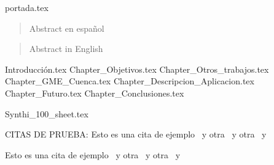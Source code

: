 \documentclass[draft, a4paper,openany,oneside,12pt]{report}
\begin{document}

	{portada.tex}
	\newpage
	\mbox{}
	\thispagestyle{empty} %
	\pagestyle{fancy}

\onehalfspace



\begin{abstract}
	\setcounter{page}{2}
	Abstract en español
	\thispagestyle{plain}
\end{abstract}
\begin{abstract}
	\setcounter{page}{3}
	Abstract in English
	\thispagestyle{plain}
\end{abstract}


	\setcounter{page}{4}
	\tableofcontents
	\listoffigures %
	\listoftables
	


	

	{Introducción.tex}
	{Chapter_Objetivos.tex}
	{Chapter_Otros_trabajos.tex}
	{Chapter_GME_Cuenca.tex}
	{Chapter_Descripcion_Aplicacion.tex}
	{Chapter_Futuro.tex}
	{Chapter_Conclusiones.tex}
	
	
	\appendix
	\appendixpage
		{Synthi_100_sheet.tex}
	
	
	CITAS DE PRUEBA: Esto es una cita de ejemplo~\cite{Lieb} y otra~ y otra~ y~\cite{GME}  ~\cite{SC_book} ~\cite{Csound_book}
	
\cite[para más detalles]{Synthi_users_manual}
 Esto es una cita de ejemplo~\cite{Synthi_users_manual} y otra~ y otra~ y~\cite{Synthi_users_manual}


	
\end{document}
